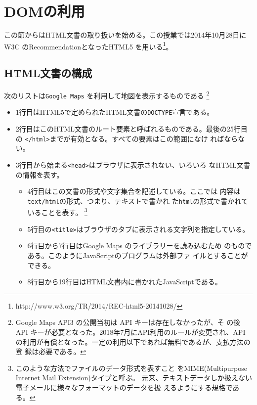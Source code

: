 \newcommand{\Elm}[1]{\texttt{<#1>}}
\newcommand{\Yes}{$\bigcirc$}
\newcommand{\No}{$\times$}
\chapter{DOMの利用}
この節からはHTML文書の取り扱いを始める。この授業では2014年10月28日にW3C
のRecommendationとなったHTML5
を用いる\footnote{http://www.w3.org/TR/2014/REC-html5-20141028/}。
\section{HTML文書の構成}
\begin{Exec}\upshape\label{ExGoogleMaps}
 次のリストは\texttt{Google Maps} を利用して地図を表示するものである
 \footnote{Google Maps API3 の公開当初は API キーは存在しなかったが、そ
 の後 API キーが必要となった。2018年7月にAPI利用のルールが変更され、API
 の利用が有償となった。一定の利用以下であれば無料であるが、支払方法の登
 録は必要である。}
\begin{itemize}
 \item 1行目はHTML5で定められたHTML文書の\texttt{DOCTYPE}宣言である。
 \item 2行目はこのHTML文書のルート要素と呼ばれるものである。最後の25行目
       の \Elm{/html}までが有効となる。すべての要素はこの範囲になけ
       ればならない。
 \item 3行目から始まる\Elm{head}はブラウザに表示されない、いろいろ
       なHTML文書の情報を表す。
         \begin{itemize}
	  \item 4行目はこの文書の形式や文字集合を記述している。ここでは
		内容は\texttt{text/html}の形式、つまり、テキストで書かれ
		た\texttt{html}の形式で書かれていることを表す。
		\footnote{このような方法でファイルのデータ形式を表すこと
       をMIME(Multipurpose Internet Mail Extension)タイプと呼ぶ。
       元来、テキストデータしか扱えない電子メールに様々なフォーマットのデータを扱
		えるようにする規格である。}
	  \item 5行目の\Elm{title}はブラウザのタブに表示される文字列を指定している。
	  \item 6行目から7行目はGoogle Maps のライブラリーを読み込むため
		のものである。このようにJavaScriptのプログラムは外部ファ
		イルとすることができる。
	  \item 8行目から19行目はHTML文書内に書かれたJavaScriptである。

\end{itemize}
\end{itemize}
\end{Exec}

